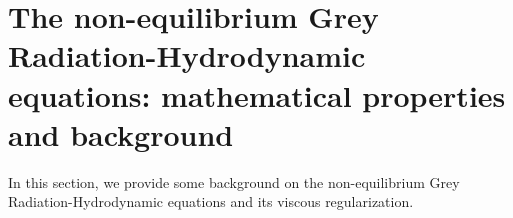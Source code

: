 \documentclass[times,doublespace]{fldauth}%
\begin{document}
\section{The non-equilibrium Grey Radiation-Hydrodynamic equations: mathematical properties and background}
\label{sec:GRH}
%
In this section, we provide some background on the non-equilibrium Grey Radiation-Hydrodynamic equations and  its viscous regularization.
%
%

\end{document}
